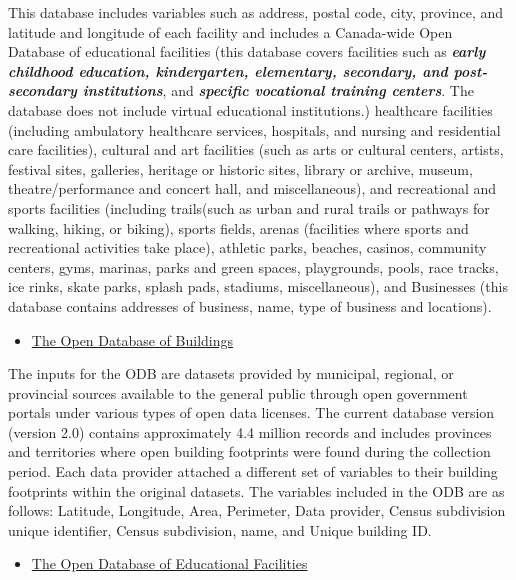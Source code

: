 \documentclass[
11pt, %
oneside, %
english, %
singlespacing, %
]{macthesis} %
\def\tightlist{}
\begin{document}
This database includes variables such as address, postal code, city, province, and latitude and longitude of each facility and includes a Canada-wide Open Database of educational facilities (this database covers facilities such as \textbf{\emph{early childhood education, kindergarten, elementary, secondary, and post-secondary institutions}}, and \textbf{\emph{specific vocational training centers}}. The database does not include virtual educational institutions.) healthcare facilities (including ambulatory healthcare services, hospitals, and nursing and residential care facilities), cultural and art facilities (such as arts or cultural centers, artists, festival sites, galleries, heritage or historic sites, library or archive, museum, theatre/performance and concert hall, and miscellaneous), and recreational and sports facilities (including trails(such as urban and rural trails or pathways for walking, hiking, or biking), sports fields, arenas (facilities where sports and recreational activities take place), athletic parks, beaches, casinos, community centers, gyms, marinas, parks and green spaces, playgrounds, pools, race tracks, ice rinks, skate parks, splash pads, stadiums, miscellaneous), and Businesses (this database contains addresses of business, name, type of business and locations).

\begin{itemize}
\tightlist
\item
  \href{https://www.statcan.gc.ca/en/lode/databases/odb}{The Open Database of Buildings}
\end{itemize}

The inputs for the ODB are datasets provided by municipal, regional, or provincial sources available to the general public through open government portals under various types of open data licenses. The current database version (version 2.0) contains approximately 4.4 million records and includes provinces and territories where open building footprints were found during the collection period. Each data provider attached a different set of variables to their building footprints within the original datasets. The variables included in the ODB are as follows: Latitude, Longitude, Area, Perimeter, Data provider, Census subdivision unique identifier, Census subdivision, name, and Unique building ID.

\begin{itemize}
\tightlist
\item
  \href{https://www.statcan.gc.ca/en/lode/databases/odef}{The Open Database of Educational Facilities}
\end{itemize}
\end{document}
